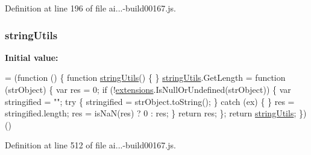 Definition at line 196 of file ai...-\/build00167.\+js.

\subsubsection[{\texorpdfstring{string\+Utils}{stringUtils}}]{ string\+Utils}\hypertarget{_scripts_2ai_80_822_89-build00167_8js_a89651b896296468ad2af0726858df446}{}\label{_scripts_2ai_80_822_89-build00167_8js_a89651b896296468ad2af0726858df446}
{\bfseries Initial value\+:}
\begin{DoxyCode}
= (\textcolor{keyword}{function} () \{
            \textcolor{keyword}{function} \hyperlink{obj_2_release_2_package_2_package_tmp_2_scripts_2ai_80_822_89-build00167_8js_a89651b896296468ad2af0726858df446}{stringUtils}() \{
            \}
            \hyperlink{obj_2_release_2_package_2_package_tmp_2_scripts_2ai_80_822_89-build00167_8js_a89651b896296468ad2af0726858df446}{stringUtils}.GetLength = \textcolor{keyword}{function} (strObject) \{
                var res = 0;
                \textcolor{keywordflow}{if} (!\hyperlink{obj_2_release_2_package_2_package_tmp_2_scripts_2ai_80_822_89-build00167_8js_a9ce4e17b92e5debce1c72727f3bdd551}{extensions}.IsNullOrUndefined(strObject)) \{
                    var stringified = \textcolor{stringliteral}{""};
                    \textcolor{keywordflow}{try} \{
                        stringified = strObject.toString();
                    \}
                    \textcolor{keywordflow}{catch} (ex) \{
                    \}
                    res = stringified.length;
                    res = isNaN(res) ? 0 : res;
                \}
                \textcolor{keywordflow}{return} res;
            \};
            \textcolor{keywordflow}{return} \hyperlink{obj_2_release_2_package_2_package_tmp_2_scripts_2ai_80_822_89-build00167_8js_a89651b896296468ad2af0726858df446}{stringUtils};
        \})()
\end{DoxyCode}


Definition at line 512 of file ai...-\/build00167.\+js.

